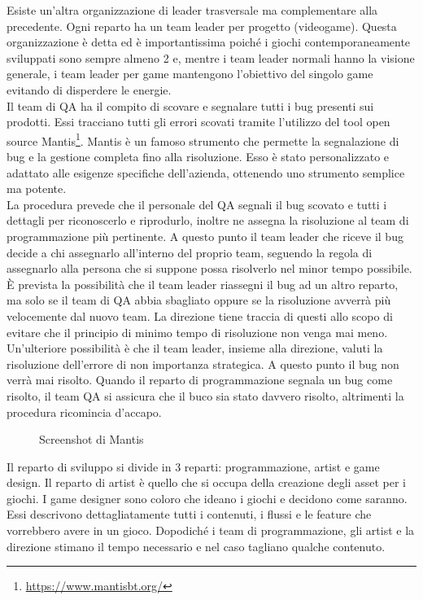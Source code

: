 Esiste un'altra organizzazione di leader trasversale ma complementare alla precedente. Ogni reparto ha un team leader per progetto (videogame). Questa organizzazione è detta  ed è importantissima poiché i giochi contemporaneamente sviluppati sono sempre almeno 2 e, mentre i team leader normali hanno la visione generale, i team leader per game mantengono l'obiettivo del singolo game evitando di disperdere le energie.\\

Il team di QA ha il compito di scovare e segnalare tutti i \gls{bug} presenti sui prodotti. Essi tracciano tutti gli errori scovati tramite l'utilizzo del tool open source Mantis\footnote{\url{https://www.mantisbt.org/}}. Mantis è un famoso strumento che permette la segnalazione di bug e la gestione completa fino alla risoluzione. Esso è stato personalizzato e adattato alle esigenze specifiche dell'azienda, ottenendo uno strumento semplice ma potente.\\

La procedura prevede che il personale del QA segnali il bug scovato e tutti i dettagli per riconoscerlo e riprodurlo, inoltre ne assegna la risoluzione al team di programmazione più pertinente. A questo punto il team leader che riceve il bug decide a chi assegnarlo all'interno del proprio team, seguendo la regola di assegnarlo alla persona che si suppone possa risolverlo nel minor tempo possibile. È prevista la possibilità che il team leader riassegni il bug ad un altro reparto, ma solo se il team di QA abbia sbagliato oppure se la risoluzione avverrà più velocemente dal nuovo team. La direzione tiene traccia di questi  allo scopo di evitare che il principio di minimo tempo di risoluzione non venga mai meno. Un'ulteriore possibilità è che il team leader, insieme alla direzione, valuti la risoluzione dell'errore di non importanza strategica. A questo punto il bug non verrà mai risolto. Quando il reparto di programmazione segnala un bug come risolto, il team QA si assicura che il buco sia stato davvero risolto, altrimenti la procedura ricomincia d'accapo.\\

\begin{figure}
	\centering
	\caption{Screenshot di Mantis}
	\label{fig:screenshot-mantis}
\end{figure}

Il reparto di sviluppo si divide in 3 reparti: programmazione, artist e game design. Il reparto di artist è quello che si occupa della creazione degli asset per i giochi. I game designer sono coloro che ideano i giochi e decidono come saranno. Essi descrivono dettagliatamente tutti i contenuti, i flussi e le feature che vorrebbero avere in un gioco. Dopodiché i team di programmazione, gli artist e la direzione stimano il tempo necessario e nel caso tagliano qualche contenuto.\\

